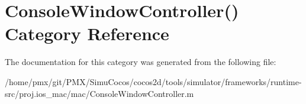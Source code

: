 \hypertarget{categoryConsoleWindowController_07_08}{}\section{Console\+Window\+Controller() Category Reference}
\label{categoryConsoleWindowController_07_08}


The documentation for this category was generated from the following file\+:\begin{DoxyCompactItemize}
\item 
/home/pmx/git/\+P\+M\+X/\+Simu\+Cocos/cocos2d/tools/simulator/frameworks/runtime-\/src/proj.\+ios\+\_\+mac/mac/Console\+Window\+Controller.\+m\end{DoxyCompactItemize}
